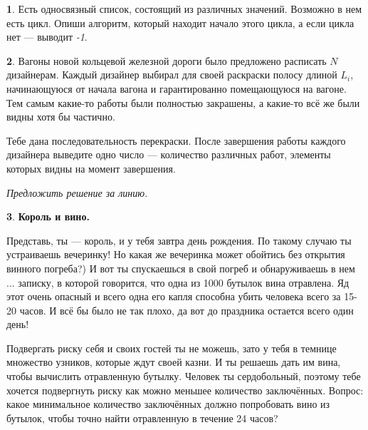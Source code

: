 \documentclass[14pt, a4paper]{extarticle}
\theoremstyle{definition}
\newtheorem{problem}{}
\theoremstyle{definition}
\theoremstyle{remark}
\numberwithin{equation}{section}
\begin{document}
\begin{problem}
    Есть односвязный список, состоящий из различных значений. 
    Возможно в нем есть цикл. Опиши алгоритм, который находит
    начало этого цикла, а если цикла нет --- выводит \textit{-1}.

\end{problem}

\begin{problem}
    Вагоны новой кольцевой железной дороги было предложено расписать 
    $N$ дизайнерам. Каждый дизайнер выбирал для своей раскраски полосу 
    длиной $L_i$, начинающуюся от начала вагона и гарантированно 
    помещающуюся на вагоне. Тем самым какие-то работы были полностью 
    закрашены, а какие-то всё же были видны хотя бы частично.

    Тебе дана последовательность перекраски. После завершения работы 
    каждого дизайнера выведите одно число — количество различных работ, 
    элементы которых видны на момент завершения.

    \textit{Предложить решение за линию.}
\end{problem}

\begin{problem}
    \textbf{Король и вино.}

    Представь, ты --- король, и у тебя завтра день рождения. По такому случаю ты устраиваешь
    вечеринку! Но какая же вечеринка может обойтись без открытия винного погреба?)
    И вот ты спускаешься в свой погреб и обнаруживаешь в нем ... записку, в которой говорится,
    что одна из 1000 бутылок вина отравлена. Яд этот очень опасный и всего одна его капля
    способна убить человека всего за 15-20 часов. И всё бы было не так плохо, да вот до праздника
    остается всего один день! 
    
    Подвергать риску себя и своих гостей ты не можешь, зато у тебя 
    в темнице множество узников, которые ждут своей казни. И ты решаешь дать им вина,
    чтобы вычислить отравленную бутылку. Человек ты сердобольный, поэтому тебе хочется подвергнуть
    риску как можно меньшее количество заключённых. Вопрос: какое минимальное количество 
    заключённых должно попробовать вино из бутылок, чтобы точно найти отравленную в течение 24 часов?
\end{problem}
\end{document}
